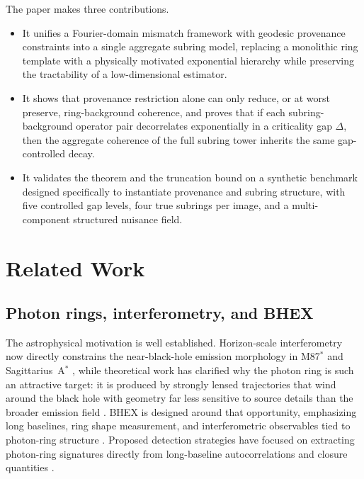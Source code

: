 \documentclass[11pt,a4paper]{article}
\theoremstyle{definition}
\theoremstyle{remark}
\begin{document}
The paper makes three contributions.
\begin{itemize}
\item It unifies a Fourier-domain mismatch framework with geodesic provenance constraints into a single aggregate subring model, replacing a monolithic ring template with a physically motivated exponential hierarchy while preserving the tractability of a low-dimensional estimator.
\item It shows that provenance restriction alone can only reduce, or at worst preserve, ring-background coherence, and proves that if each subring-background operator pair decorrelates exponentially in a criticality gap $\Delta$, then the aggregate coherence of the full subring tower inherits the same gap-controlled decay.
\item It validates the theorem and the truncation bound on a synthetic benchmark designed specifically to instantiate provenance and subring structure, with five controlled gap levels, four true subrings per image, and a multi-component structured nuisance field.
\end{itemize}

\section{Related Work}

\subsection{Photon rings, interferometry, and BHEX}

The astrophysical motivation is well established. Horizon-scale interferometry now directly constrains the near-black-hole emission morphology in M87$^\ast$ and Sagittarius~A$^\ast$ \citep{EHT2019M87,EHT2022SgrA}, while theoretical work has clarified why the photon ring is such an attractive target: it is produced by strongly lensed trajectories that wind around the black hole with geometry far less sensitive to source details than the broader emission field \citep{Johnson2020Universal,Gralla2019Shadow,Gralla2020Lensing}. BHEX is designed around that opportunity, emphasizing long baselines, ring shape measurement, and interferometric observables tied to photon-ring structure \citep{Johnson2024Vision,Lupsasca2024BHEX,Farah2025Spin}. Proposed detection strategies have focused on extracting photon-ring signatures directly from long-baseline autocorrelations and closure quantities \citep{Tiede2022Photon,Chael2018Closure}.
\end{document}
